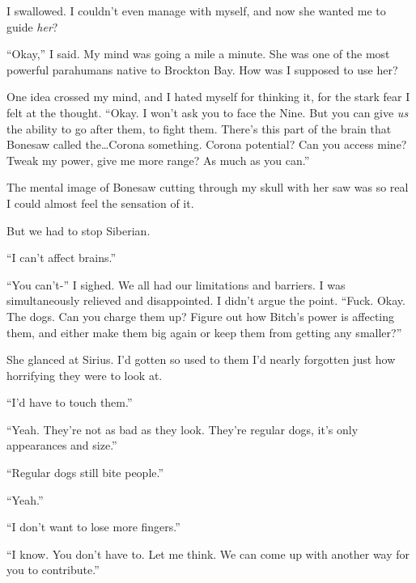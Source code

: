 I swallowed.  I couldn't even manage with myself, and now she wanted me to guide \emph{her}?



``Okay,'' I said.  My mind was going a mile a minute.  She was one of the most powerful parahumans native to Brockton Bay.  How was I supposed to use her?



One idea crossed my mind, and I hated myself for thinking it, for the stark fear I felt at the thought.  ``Okay.  I won't ask you to face the Nine.  But you can give \emph{us} the ability to go after them, to fight them.  There's this part of the brain that Bonesaw called the\ldots Corona something.  Corona potential?  Can you access mine?  Tweak my power, give me more range?  As much as you can.''



The mental image of Bonesaw cutting through my skull with her saw was so real I could almost feel the sensation of it.



But we had to stop Siberian.



``I can't affect brains.''



``You can't-''  I sighed.  We all had our limitations and barriers.  I was simultaneously relieved and disappointed.  I didn't argue the point.  ``Fuck.  Okay.  The dogs.  Can you charge them up?  Figure out how Bitch's power is affecting them, and either make them big again or keep them from getting any smaller?''



She glanced at Sirius.  I'd gotten so used to them I'd nearly forgotten just how horrifying they were to look at.



``I'd have to touch them.''



``Yeah.  They're not as bad as they look.  They're regular dogs, it's only appearances and size.''



``Regular dogs still bite people.''



``Yeah.''



``I don't want to lose more fingers.''



``I know.  You don't have to.  Let me think.  We can come up with another way for you to contribute.''




